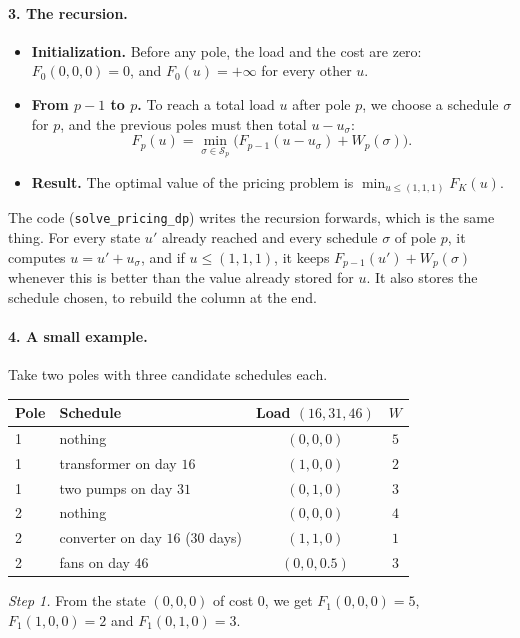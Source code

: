 \documentclass[11pt]{article}
\begin{document}
\paragraph{3. The recursion.}
\begin{itemize}
  \item \textbf{Initialization.} Before any pole, the load and the cost are zero:
        $F_0(0, 0, 0) = 0$, and $F_0(u) = +\infty$ for every other $u$.
  \item \textbf{From $p - 1$ to $p$.} To reach a total load $u$ after pole $p$, we choose a schedule
        $\sigma$ for $p$, and the previous poles must then total $u - u_\sigma$:
        \[
          F_p(u) = \min_{\sigma \in \mathcal S_p} \Big( F_{p-1}(u - u_\sigma) + W_p(\sigma) \Big).
        \]
  \item \textbf{Result.} The optimal value of the pricing problem is $\min_{u \le (1,1,1)} F_K(u)$.
\end{itemize}
The code (\texttt{solve\_pricing\_dp}) writes the recursion forwards, which is the same thing. For
every state $u'$ already reached and every schedule $\sigma$ of pole $p$, it computes $u = u' +
u_\sigma$, and if $u \le (1,1,1)$, it keeps $F_{p-1}(u') + W_p(\sigma)$ whenever this is better than
the value already stored for $u$. It also stores the schedule chosen, to rebuild the column at the
end.

\paragraph{4. A small example.} Take two poles with three candidate schedules each.
\begin{center}
\begin{tabular}{llcc}
  \toprule
  Pole & Schedule & Load $(16, 31, 46)$ & $W$ \\
  \midrule
  1 & nothing & $(0, 0, 0)$ & $5$ \\
  1 & transformer on day $16$ & $(1, 0, 0)$ & $2$ \\
  1 & two pumps on day $31$ & $(0, 1, 0)$ & $3$ \\
  2 & nothing & $(0, 0, 0)$ & $4$ \\
  2 & converter on day $16$ ($30$ days) & $(1, 1, 0)$ & $1$ \\
  2 & fans on day $46$ & $(0, 0, 0.5)$ & $3$ \\
  \bottomrule
\end{tabular}
\end{center}
\emph{Step 1.} From the state $(0,0,0)$ of cost $0$, we get $F_1(0,0,0) = 5$, $F_1(1,0,0) = 2$ and
$F_1(0,1,0) = 3$.
\end{document}
